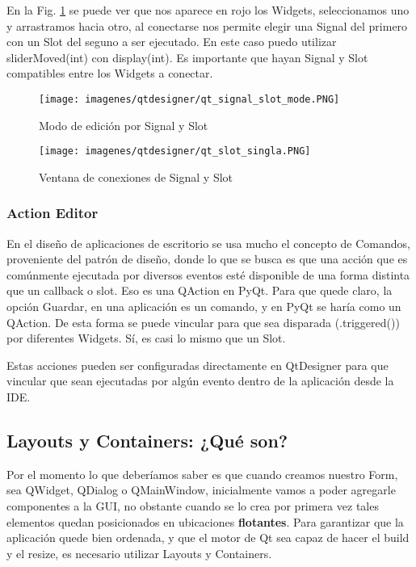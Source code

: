 En la Fig. \ref{fig:qt_signal_slot_0} se puede ver que nos aparece en rojo los Widgets, seleccionamos uno y arrastramos hacia otro,
al conectarse nos permite elegir una Signal del primero con un Slot del seguno a ser ejecutado. En este caso puedo utilizar sliderMoved(int)
con display(int). Es importante que hayan Signal y Slot compatibles entre los Widgets a conectar.

\begin{figure}[H]
    \centering
    \texttt{[image: imagenes/qtdesigner/qt\_signal\_slot\_mode.PNG]}
    \caption{Modo de edici\'on por Signal y Slot}
    \label{fig:qt_signal_slot_0}
\end{figure}

\begin{figure}[H]
    \centering
    \texttt{[image: imagenes/qtdesigner/qt\_slot\_singla.PNG]}
    \caption{Ventana de conexiones de Signal y Slot}
    \label{fig:qt_signal_slot_1}
\end{figure}

\subsubsection{Action Editor}
En el dise\~no de aplicaciones de escritorio se usa mucho el concepto de Comandos, proveniente del patr\'on de dise\~no, donde lo que se busca es que una acci\'on
que es com\'unmente ejecutada por diversos eventos est\'e disponible de una forma distinta que un callback o slot. Eso es una QAction en PyQt.
Para que quede claro, la opci\'on Guardar, en una aplicaci\'on es un comando, y en PyQt se har\'ia como un QAction. De esta forma se puede vincular
para que sea disparada (.triggered()) por diferentes Widgets. S\'i, es casi lo mismo que un Slot.


Estas acciones pueden ser configuradas directamente en QtDesigner para que vincular que sean
ejecutadas por alg\'un evento dentro de la aplicaci\'on desde la IDE.

\subsection{Layouts y Containers: ¿Qu\'e son?}
Por el momento lo que deber\'iamos saber es que cuando creamos nuestro Form, sea QWidget, QDialog o QMainWindow, inicialmente vamos a poder
agregarle componentes a la GUI, no obstante cuando se lo crea por primera vez tales elementos quedan posicionados en ubicaciones \textbf{flotantes}.
Para garantizar que la aplicaci\'on quede bien ordenada, y que el motor de Qt sea capaz de hacer el build y el resize, es necesario utilizar Layouts y Containers.

